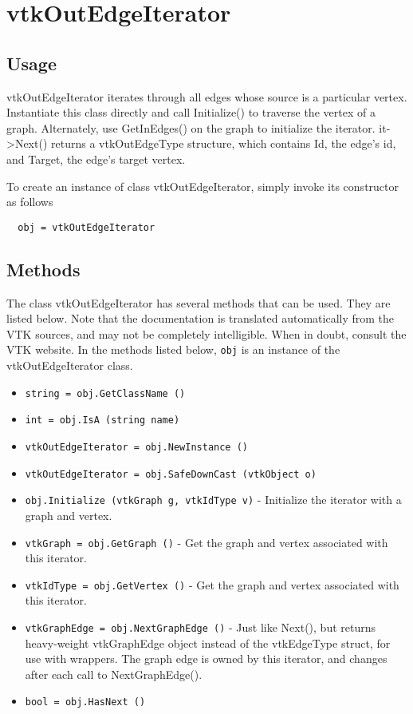 \section{vtkOutEdgeIterator}

\subsection{Usage}

 vtkOutEdgeIterator iterates through all edges whose source is a particular
 vertex. Instantiate this class directly and call Initialize() to traverse
 the vertex of a graph. Alternately, use GetInEdges() on the graph to
 initialize the iterator. it->Next() returns a vtkOutEdgeType structure,
 which contains Id, the edge's id, and Target, the edge's target vertex.


To create an instance of class vtkOutEdgeIterator, simply
invoke its constructor as follows
\begin{verbatim}
  obj = vtkOutEdgeIterator
\end{verbatim}
\subsection{Methods}

The class vtkOutEdgeIterator has several methods that can be used.
  They are listed below.
Note that the documentation is translated automatically from the VTK sources,
and may not be completely intelligible.  When in doubt, consult the VTK website.
In the methods listed below, \verb|obj| is an instance of the vtkOutEdgeIterator class.
\begin{itemize}
\item  \verb|string = obj.GetClassName ()|

\item  \verb|int = obj.IsA (string name)|

\item  \verb|vtkOutEdgeIterator = obj.NewInstance ()|

\item  \verb|vtkOutEdgeIterator = obj.SafeDownCast (vtkObject o)|

\item  \verb|obj.Initialize (vtkGraph g, vtkIdType v)| -  Initialize the iterator with a graph and vertex.

\item  \verb|vtkGraph = obj.GetGraph ()| -  Get the graph and vertex associated with this iterator.

\item  \verb|vtkIdType = obj.GetVertex ()| -  Get the graph and vertex associated with this iterator.

\item  \verb|vtkGraphEdge = obj.NextGraphEdge ()| -  Just like Next(), but
 returns heavy-weight vtkGraphEdge object instead of
 the vtkEdgeType struct, for use with wrappers.
 The graph edge is owned by this iterator, and changes
 after each call to NextGraphEdge().

\item  \verb|bool = obj.HasNext ()|

\end{itemize}
